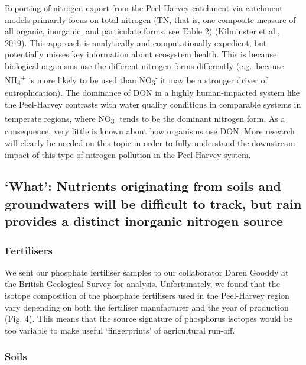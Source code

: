 \documentclass[
]{book}
\begin{document}
Reporting of nitrogen export from the Peel-Harvey catchment via catchment models primarily focus on total nitrogen (TN, that is, one composite measure of all organic, inorganic, and particulate forms, see Table 2) (Kilminster et al., 2019). This approach is analytically and computationally expedient, but potentially misses key information about ecosystem health. This is because biological organisms use the different nitrogen forms differently (e.g.~because NH\textsubscript{4}\textsuperscript{+} is more likely to be used than NO\textsubscript{3}\textsuperscript{-} it may be a stronger driver of eutrophication). The dominance of DON in a highly human-impacted system like the Peel-Harvey contrasts with water quality conditions in comparable systems in temperate regions, where NO\textsubscript{3}\textsuperscript{-} tends to be the dominant nitrogen form. As a consequence, very little is known about how organisms use DON. More research will clearly be needed on this topic in order to fully understand the downstream impact of this type of nitrogen pollution in the Peel-Harvey system.

\hypertarget{what-nutrients-originating-from-soils-and-groundwaters-will-be-difficult-to-track-but-rain-provides-a-distinct-inorganic-nitrogen-source}{%
\subsection{`What': Nutrients originating from soils and groundwaters will be difficult to track, but rain provides a distinct inorganic nitrogen source}\label{what-nutrients-originating-from-soils-and-groundwaters-will-be-difficult-to-track-but-rain-provides-a-distinct-inorganic-nitrogen-source}}

\hypertarget{fertilisers}{%
\subsubsection{Fertilisers}\label{fertilisers}}

We sent our phosphate fertiliser samples to our collaborator Daren Gooddy at the British Geological Survey for analysis. Unfortunately, we found that the isotope composition of the phosphate fertilisers used in the Peel-Harvey region vary depending on both the fertiliser manufacturer and the year of production (Fig. 4). This means that the source signature of phosphorus isotopes would be too variable to make useful `fingerprints' of agricultural run-off.

\hypertarget{soils}{%
\subsubsection{Soils}\label{soils}}
\end{document}
